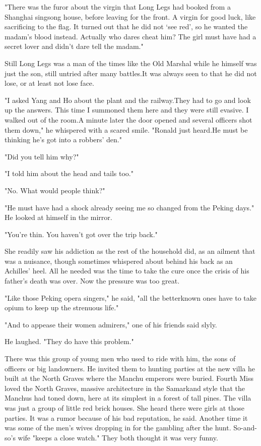 \par "There was the furor about the virgin that Long Legs had booked from a Shanghai singsong house, before leaving for the front. A virgin for good luck, like sacrificing to the flag. It turned out that he did not ‘see red', so he wanted the madam's blood instead. Actually who dares cheat him? The girl must have had a secret lover and didn't dare tell the madam."
\par Still Long Legs was a man of the times like the Old Marshal while he himself was just the son, still untried after many battles.It was always seen to that he did not lose, or at least not lose face.
\par "I asked Yang and Ho about the plant and the railway.They had to go and look up the answers. This time I summoned them here and they were still evasive. I walked out of the room.A minute later the door opened and several officers shot them down," he whispered with a scared smile. "Ronald just heard.He must be thinking he's got into a robbers' den."
\par "Did you tell him why?"
\par "I told him about the head and tails too."
\par "No. What would people think?"
\par "He must have had a shock already seeing me so changed from the Peking days." He looked at himself in the mirror.
\par "You're thin. You haven't got over the trip back."
\par She readily saw his addiction as the rest of the household did, as an ailment that was a nuisance, though sometimes whispered about behind his back as an Achilles' heel. All he needed was the time to take the cure once the crisis of his father's death was over. Now the pressure was too great.
\par "Like those Peking opera singers," he said, "all the betterknown ones have to take opium to keep up the strenuous life."
\par "And to appease their women admirers," one of his friends said slyly.
\par He laughed. "They do have this problem."
\par There was this group of young men who used to ride with him, the sons of officers or big landowners. He invited them to hunting parties at the new villa he built at the North Graves where the Manchu emperors were buried. Fourth Miss loved the North Graves, massive architecture in the Samarkand style that the Manchus had toned down, here at its simplest in a forest of tall pines. The villa was just a group of little red brick houses. She heard there were girls at those parties. It was a rumor because of his bad reputation, he said. Another time it was some of the men's wives dropping in for the gambling after the hunt. So-and-so's wife "keeps a close watch." They both thought it was very funny.
